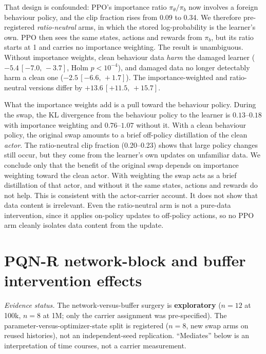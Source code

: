 \documentclass[10pt]{article} %
\newcommand{\ci}[2]{\,[#1,\,#2]}
\begin{document}
That design is confounded: PPO's importance ratio $\pi_\theta/\pi_b$ now involves a foreign behaviour policy, and the clip fraction rises from 0.09 to 0.34. We therefore pre-registered \emph{ratio-neutral} arms, in which the stored log-probability is the learner's own. PPO then sees the same states, actions and rewards from $\pi_b$, but its ratio starts at 1 and carries no importance weighting. The result is unambiguous. Without importance weights, clean behaviour data \emph{harm} the damaged learner ($-5.4\ci{-7.0}{-3.7}$, Holm $p<10^{-4}$), and damaged data no longer detectably harm a clean one ($-2.5\ci{-6.6}{+1.7}$). The importance-weighted and ratio-neutral versions differ by $+13.6\ci{+11.5}{+15.7}$.

What the importance weights add is a pull toward the behaviour policy. During the swap, the KL divergence from the behaviour policy to the learner is $0.13$--$0.18$ with importance weighting and $0.76$--$1.07$ without it. With a clean behaviour policy, the original swap amounts to a brief off-policy distillation of the clean \emph{actor}. The ratio-neutral clip fraction (0.20--0.23) shows that large policy changes still occur, but they come from the learner's own updates on unfamiliar data. We conclude only that the benefit of the original swap depends on importance weighting toward the clean actor. With weighting the swap acts as a brief distillation of that actor, and without it the same states, actions and rewards do not help. This is consistent with the actor-carrier account. It does not show that data content is irrelevant. Even the ratio-neutral arm is not a pure-data intervention, since it applies on-policy updates to off-policy actions, so no PPO arm cleanly isolates data content from the update.

\clearpage

\clearpage

\section{PQN-R network-block and buffer intervention effects}\label{sec:pqnr}

\noindent\textit{Evidence status.} The network-versus-buffer surgery is \textbf{exploratory} ($n=12$ at 100k, $n=8$ at 1M; only the carrier assignment was pre-specified). The parameter-versus-optimizer-state split is registered ($n=8$, new swap arms on reused histories), not an independent-seed replication. ``Mediates'' below is an interpretation of time courses, not a carrier measurement.
\end{document}
